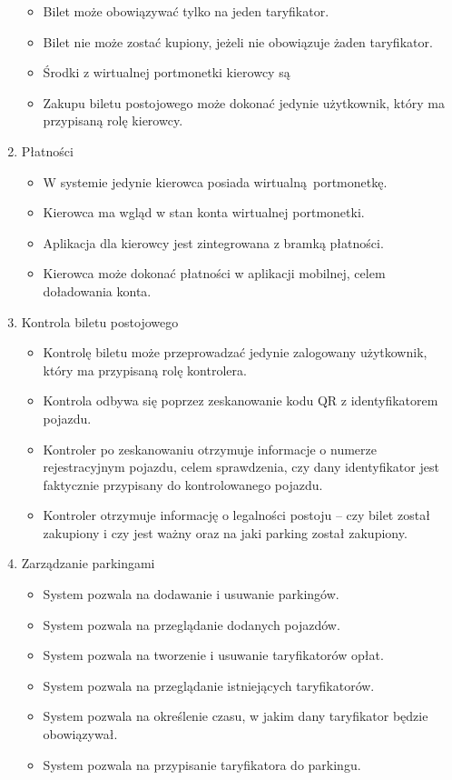 \begin{enumerate}
\begin{itemize}
			\item Bilet może obowiązywać tylko na jeden taryfikator.
			\item Bilet nie może zostać kupiony, jeżeli nie obowiązuje żaden taryfikator.
			\item Środki z wirtualnej portmonetki kierowcy są 
			\item Zakupu biletu postojowego może dokonać jedynie użytkownik, który ma przypisaną rolę kierowcy.
		\end{itemize}
	\item Płatności
		\begin{itemize}
			\item W systemie jedynie kierowca posiada wirtualną portmonetkę.
			\item Kierowca ma wgląd w stan konta wirtualnej portmonetki.
			\item Aplikacja dla kierowcy jest zintegrowana z bramką płatności.
			\item Kierowca może dokonać płatności w aplikacji mobilnej, celem doładowania konta.
		\end{itemize}
	\item Kontrola biletu postojowego
		\begin{itemize}
			\item Kontrolę biletu może przeprowadzać jedynie zalogowany użytkownik, który ma przypisaną rolę kontrolera.
			\item Kontrola odbywa się poprzez zeskanowanie kodu QR z identyfikatorem pojazdu.
			\item Kontroler po zeskanowaniu otrzymuje informacje o numerze rejestracyjnym pojazdu, celem sprawdzenia, czy dany identyfikator jest faktycznie przypisany do kontrolowanego pojazdu.
			\item Kontroler otrzymuje informację o legalności postoju -- czy bilet został zakupiony i czy jest ważny oraz na jaki parking został zakupiony.
		\end{itemize}
	\item Zarządzanie parkingami
		\begin{itemize}
			\item System pozwala na dodawanie i usuwanie parkingów.
			\item System pozwala na przeglądanie dodanych pojazdów.
			\item System pozwala na tworzenie i usuwanie taryfikatorów opłat.
			\item System pozwala na przeglądanie istniejących taryfikatorów.
			\item System pozwala na określenie czasu, w jakim dany taryfikator będzie obowiązywał.
			\item System pozwala na przypisanie taryfikatora do parkingu.
		\end{itemize}
\end{enumerate}

